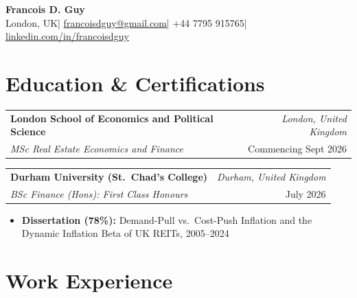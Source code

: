 \documentclass[10pt, a4paper]{article}
\makeatletter
\newcommand{\entry}[4]{%
  \noindent
  \begin{tabularx}{\linewidth}{@{}X r@{}}
    \textbf{#1} & {\small\textit{#2}} \\[-2pt]
    \textit{#3} & {\small #4}
  \end{tabularx}\vspace{1pt}%
}
\makeatother
\begin{document}
\begin{center}
  {\LARGE\bfseries Francois D. Guy}\\[4pt]
  {\small London, UK\enspace|\enspace
    \href{mailto:francoisdguy@gmail.com}{francoisdguy@gmail.com}\enspace|\enspace
    +44 7795 915765\enspace|\enspace
    \href{https://linkedin.com/in/francoisdguy}{linkedin.com/in/francoisdguy}}
\end{center}

\vspace{4pt}

\section{Education \& Certifications}

\entry{London School of Economics and Political Science}{London, United Kingdom}
  {MSc Real Estate Economics and Finance}{Commencing Sept 2026}

\vspace{4pt}
\entry{Durham University (St.\ Chad's College)}{Durham, United Kingdom}
  {BSc Finance (Hons): First Class Honours}{July 2026}
\begin{itemize}
  \item \textbf{Dissertation (78\%):} Demand-Pull vs.\ Cost-Push Inflation and the Dynamic Inflation Beta of UK REITs, 2005--2024
\end{itemize}

\vspace{4pt}

\section{Work Experience}
\end{document}
